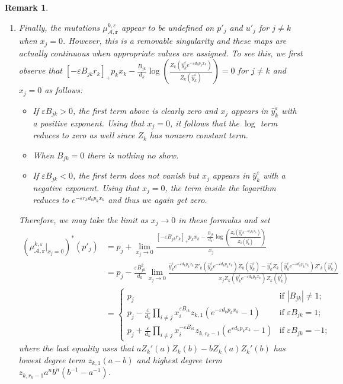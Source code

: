 \documentclass{amsart}
\newtheorem{remark}[theorem]{Remark}
\numberwithin{equation}{section}
\newcommand{\bfr}{{\boldsymbol{r}}}
\newcommand{\cA}{\mathcal{A}}
\newcommand{\CC}{\mathbb{C}}
\begin{document}
\begin{remark}
\begin{enumerate}
      Away from these loci in the complex case, the identity image can again be used to define a splitting of the $d_k$-fold covering map from $\CC_\times$ to $\CC_\times$.
    \item Finally, the mutations $\mu_{\cA,\bfr}^{k,\varepsilon}$ appear to be undefined on $p'_j$ and $u'_j$ for $j\ne k$ when $x_j=0$.
      However, this is a removable singularity and these maps are actually continuous when appropriate values are assigned.
      To see this, we first observe that $[-\varepsilon B_{jk} r_k]_+ p_k x_k - \frac{B_{jk}}{d_k}\log\left(\frac{Z_k(\hat y_k^\varepsilon e^{-\varepsilon d_kp_kx_k})}{Z_k(\hat y_k^\varepsilon)}\right)=0$ for $j\ne k$ and $x_j=0$ as follows:
      \begin{itemize}
        \item If $\varepsilon B_{jk}>0$, the first term above is clearly zero and $x_j$ appears in $\hat y_k^\varepsilon$ with a positive exponent.
          Using that $x_j=0$, it follows that the $\log$ term reduces to zero as well since $Z_k$ has nonzero constant term.
        \item When $B_{jk}=0$ there is nothing no show.
        \item If $\varepsilon B_{jk}<0$, the first term does not vanish but $x_j$ appears in $\hat y_k^\varepsilon$ with a negative exponent.
          Using that $x_j=0$, the term inside the logarithm reduces to $e^{-\varepsilon r_kd_kp_kx_k}$ and thus we again get zero.
      \end{itemize}
      Therefore, we may take the limit as $x_j\to0$ in these formulas and set
      \begin{align*}
        (\mu_{\cA,\bfr}^{k,\varepsilon}|_{x_j=0})^*(p'_j)
        &=p_j+\lim_{x_j \to 0}\frac{[-\varepsilon B_{jk} r_k]_+ p_k x_k - \frac{B_{jk}}{d_k}\log\left(\frac{Z_k(\hat y_k^\varepsilon e^{-\varepsilon d_kp_kx_k})}{Z_k(\hat y_k^\varepsilon)}\right)}{x_j}\\
        &=p_j-\frac{\varepsilon B_{jk}^2}{d_k} \lim_{x_j\to 0} \frac{ \hat y_k^\varepsilon e^{-\varepsilon d_kp_kx_k} Z'_k(\hat y_k^\varepsilon e^{-\varepsilon d_kp_kx_k}) Z_k(\hat y_k^\varepsilon) - \hat y_k^\varepsilon Z_k(\hat y_k^\varepsilon e^{-\varepsilon d_kp_kx_k}) Z'_k(\hat y_k^\varepsilon) }{ x_j Z_k(\hat y_k^\varepsilon e^{-\varepsilon d_kp_kx_k}) Z_k(\hat y_k^\varepsilon) }\\
        &=\begin{cases} 
          p_j & \text{if $|B_{jk}| \ne 1$;}\\ 
          p_j - \frac{\varepsilon}{d_k} \prod_{i\ne j} x_i^{\varepsilon B_{ik}} z_{k,1} (e^{-\varepsilon d_kp_kx_k} - 1) & \text{if $\varepsilon B_{jk} = 1$;}\\ 
          p_j + \frac{\varepsilon}{d_k} \prod_{i\ne j} x_i^{-\varepsilon B_{ik}} z_{k,r_k-1} (e^{\varepsilon d_kp_kx_k} - 1) & \text{if $\varepsilon B_{jk} = -1$;}
        \end{cases}
      \end{align*}
      where the last equality uses that $a Z_k'(a) Z_k(b) - b Z_k(a) Z_k'(b)$ has lowest degree term $z_{k,1}(a-b)$ and highest degree term $z_{k,r_k-1} a^n b^n (b^{-1}-a^{-1})$.


\end{enumerate}
\end{remark}
\end{document}
